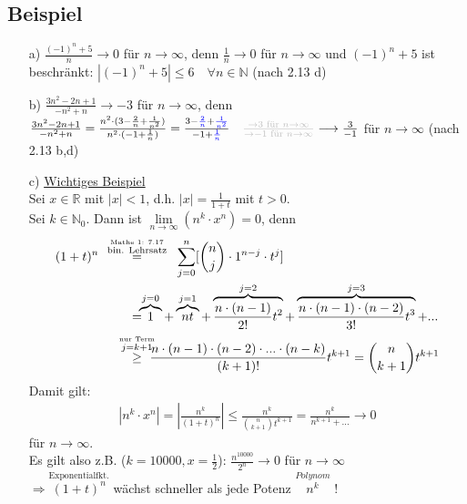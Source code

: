 \documentclass[12pt, titlepage]{article}
\newcommand{\R}{\mathds{R}}
\newcommand{\N}{\mathds{N}}
\newcommand{\infn}{n\rightarrow\infty}
\newcommand{\bmark}[1]{\textcolor{blue}{#1}}
\newcommand{\gmark}[1]{\textcolor{lightgray}{#1}}
\renewcommand{\*}{\cdot}
\begin{document}
	\subsection{Beispiel}
	\begin{itemize}
		\item[a)] $\frac{(-1)^n+5}{n}\rightarrow0$ für $\infn$, denn $\frac{1}{n}\rightarrow0$ für $\infn$ und $(-1)^n+5$ ist beschränkt: $|(-1)^n+5|\leq6\quad\forall n\in\N$ (nach 2.13 d)
		\item[b)] $\frac{3n^2-2n+1}{-n^2+n}\rightarrow-3$ für $\infn$, denn\\ $\frac{3n^2-2n+1}{-n^2+n}=\frac{n^2\*(3-\frac{2}{n}+\frac{1}{n^2})}{n^2\*(-1+\frac{1}{n})}=\frac{3-\bmark{\frac{2}{n}}+\bmark{\frac{1}{n^2}}}{-1+\bmark{\frac{1}{n}}}\quad\gmark{\frac{\rightarrow3\textrm{ für }\infn}{\rightarrow-1\textrm{ für }\infn}}\longrightarrow\frac{3}{-1}$ für $\infn$ (nach 2.13 b,d)\begin{tiny}
			[\bmark{Nullfolgen}]
		\end{tiny}
		\item[c)] \underline{Wichtiges Beispiel}\\
		Sei $x\in\R$ mit $|x|<1$, d.h. $|x|=\frac{1}{1+t}$ mit $t>0$.\\
		Sei $k\in\N_0$. Dann ist $\lim\limits_{\infn}(n^k\*x^n)=0$, denn
		\begin{align*}
			(1+t)^n\quad&\qquad\mathclap{\overset{\overset{\textrm{Mathe 1: 7.17}}{\textrm{bin. Lehrsatz}}}{=}}\qquad\quad\sum_{j=0}^{n}[\binom{n}{j}\*1^{n-j}\*t^j]\\
			&\qquad\mathclap{=}\overbrace{1}^{j=0}+\overbrace{nt}^{j=1}+\overbrace{\frac{n\*(n-1)}{2!}t^2}^{j=2}+\overbrace{\frac{n\*(n-1)\*(n-2)}{3!}t^3}^{j=3}+...\\
			&\qquad\mathclap{\overset{\overset{\textrm{nur Term}}{j=k+1}}{\geq}}\quad\frac{n\*(n-1)\*(n-2)\*...\*(n-k)}{(k+1)!}t^{k+1}=\binom{n}{k+1}t^{k+1}
		\end{align*}
		Damit gilt:
		\begin{align*}
			|n^k\*x^n|=|\frac{n^k}{(1+t)^n}|\leq\frac{n^k}{\binom{n}{k+1}t^{k+1}}=\frac{n^k}{n^{k+1}+...}\rightarrow 0
		\end{align*}
		für $\infn$.\\
		Es gilt also z.B. ($k=10000, x=\frac{1}{2}$): $\frac{n^{10000}}{2^{n}} \rightarrow 0$ für $\infn$\\
		$\Rightarrow \overset{\textrm{Exponentialfkt.}}{(1+t)^n}$ wächst schneller als jede Potenz $\overset{Polynom}{n^k}$ !
	\end{itemize}
\end{document}
